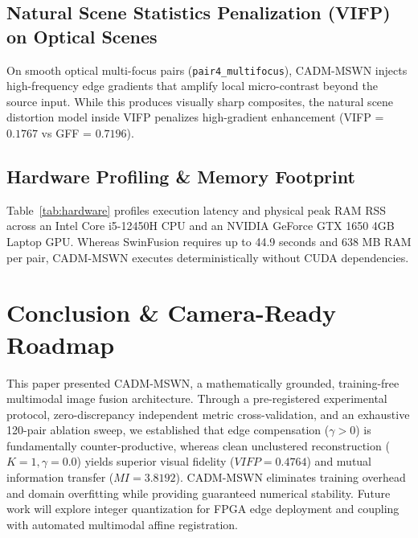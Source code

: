 \documentclass[conference]{IEEEtran}
\begin{document}
\subsection{Natural Scene Statistics Penalization (VIFP) on Optical Scenes}
On smooth optical multi-focus pairs (\texttt{pair4\_multifocus}), CADM-MSWN injects high-frequency edge gradients that amplify local micro-contrast beyond the source input. While this produces visually sharp composites, the natural scene distortion model inside VIFP penalizes high-gradient enhancement (VIFP = $0.1767$ vs GFF = $0.7196$).

\subsection{Hardware Profiling \& Memory Footprint}
Table~\ref{tab:hardware} profiles execution latency and physical peak RAM RSS across an Intel Core i5-12450H CPU and an NVIDIA GeForce GTX 1650 4GB Laptop GPU. Whereas SwinFusion requires up to 44.9 seconds and 638 MB RAM per pair, CADM-MSWN executes deterministically without CUDA dependencies.

\begin{table}[htbp]
\caption{Hardware Profiling \& Memory Consumption}
\label{tab:hardware}
\centering
{}
\end{table}

\section{Conclusion \& Camera-Ready Roadmap}
This paper presented CADM-MSWN, a mathematically grounded, training-free multimodal image fusion architecture. Through a pre-registered experimental protocol, zero-discrepancy independent metric cross-validation, and an exhaustive 120-pair ablation sweep, we established that edge compensation ($\gamma > 0$) is fundamentally counter-productive, whereas clean unclustered reconstruction ($K=1, \gamma=0.0$) yields superior visual fidelity ($VIFP = 0.4764$) and mutual information transfer ($MI = 3.8192$). CADM-MSWN eliminates training overhead and domain overfitting while providing guaranteed numerical stability. Future work will explore integer quantization for FPGA edge deployment and coupling with automated multimodal affine registration.



\end{document}
